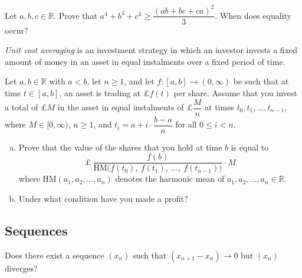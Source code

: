 \begin{chapex}
Let $a,b,c \in \mathbb{R}$. Prove that $a^4 + b^4 + c^4 \ge \dfrac{(ab+bc+ca)^2}{3}$. When does equality occur?
\end{chapex}

\begin{chapex}
\textit{Unit cost averaging} is an investment strategy in which an investor invests a fixed amount of money in an asset in equal instalments over a fixed period of time.

Let $a,b \in \mathbb{R}$ with $a<b$, let $n \ge 1$, and let $f : [a,b] \to (0,\infty)$ be such that at time $t \in [a,b]$, an asset is trading at £$f(t)$ per share. Assume that you invest a total of £$M$ in the asset in equal instalments of £$\dfrac{M}{n}$ at times $t_0, t_1, \dots, t_{n-1}$, where $M \in [0,\infty)$, $n \ge 1$, and $t_i = a + i \cdot \dfrac{b-a}{n}$ for all $0 \le i < n$.

\begin{enumerate}[(a)]
\item Prove that the value of the shares that you hold at time $b$ is equal to
\[ \text{£}~\dfrac{f(b)}{\mathrm{HM} \big ( f(t_0),~ f(t_1),~ \dots,~ f(t_{n-1}) \big)} \cdot M \]
where $\mathrm{HM}(a_1,a_2,\dots,a_n)$ denotes the harmonic mean of $a_1,a_2,\dots,a_n \in \mathbb{R}$.

\item Under what condition have you made a profit?
\end{enumerate}
\end{chapex}

\subsection*{Sequences}

\begin{chapex}
Does there exist a sequence $(x_n)$ such that $(x_{n+1} - x_n) \to 0$ but $(x_n)$ diverges?
\end{chapex}